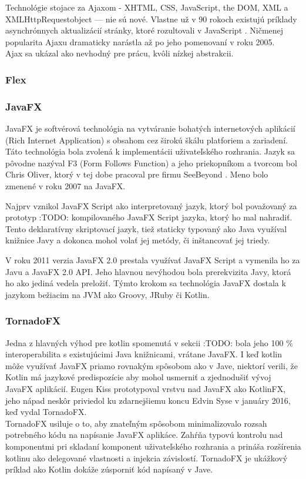 Technológie stojace za Ajaxom - XHTML, CSS, JavaScript, the DOM, XML a XMLHttpRequestobject — nie sú nové. Vlastne už v 90 rokoch existujú príklady asynchrónnych aktualizácií stránky, ktoré rozultovali v JavaScript \cite{deitel2008ajax}. Ničmenej popularita Ajaxu dramaticky narástla až po jeho pomenovaní v roku 2005. \\

Ajax sa ukázal ako nevhodný pre prácu, kvôli nízkej abstrakcii.

\subsubsection{Flex}

\subsubsection{JavaFX}
 JavaFX je softvérová technológia na vytváranie bohatých internetových aplikácií (Rich Internet Application) s obsahom cez širokú škálu platforiem a zariadení.
Táto technológia bola zvolená k implementácii uživateľského rozhrania. Jazyk sa pôvodne nazýval F3 (Form Follows Function) a jeho priekopníkom a tvorcom bol Chris Oliver, ktorý v tej dobe pracoval pre firmu SeeBeyond \cite{dea2011javafx}. Meno bolo zmenené v roku 2007 na JavaFX. \cite{anderson2009essential}

Najprv vznikol JavaFX Script ako interpretovaný jazyk, ktorý bol považovaný za prototyp :TODO: kompilovaného JavaFX Script jazyka, ktorý ho mal nahradiť. Tento deklaratívny skriptovací jazyk, tiež staticky typovaný ako Java využíval knižnice Javy a dokonca mohol volať jej metódy, či inštancovať jej triedy. \cite{weaver2007javafx}

V roku 2011 verzia JavaFX 2.0 prestala využívať JavaFX Script a vymenila ho za Javu a JavaFX 2.0 API. \cite{dea2011javafx}Jeho hlavnou nevýhodou bola prerekvizita Javy, ktorá ho ako jediná vedela preložiť. Týmto krokom sa technológia JavaFX dostala k jazykom bežiacim na JVM ako Groovy, JRuby či Kotlin.

\subsubsection{TornadoFX}

Jedna z hlavných výhod pre kotlin spomenutá v sekcii :TODO: bola
jeho 100 \% interoperabilita s existujúcimi Java knižnicami, vrátane JavaFX. I keď kotlin môže využívať JavaFX priamo rovnakým spôsobom ako v Jave, niektorí verili, že Kotlin má jazykové predispozície aby mohol usmerniť a zjednodušiť vývoj JavaFX aplikácií. Eugen Kiss prototypoval vrstvu nad JavaFX ako KotlinFX, jeho nápad neskôr priviedol ku zdarnejšiemu koncu Edvin Syse v januáry 2016\cite{tornadofx}, keď vydal TornadoFX.
\\
TornadoFX usiluje o to, aby znateľným spôsobom minimalizovalo rozsah potrebného kódu na napísanie JavaFX aplikáce. Zahŕňa typovú kontrolu nad komponentmi pri skladaní komponent uživateľského rozhrania a prináša rozšírenia kotlinu ako delegované vlastnosti a injekcia závislostí. TornadoFX je ukážkový príklad ako Kotlin dokáže zúsporniť kód napísaný v Jave.

